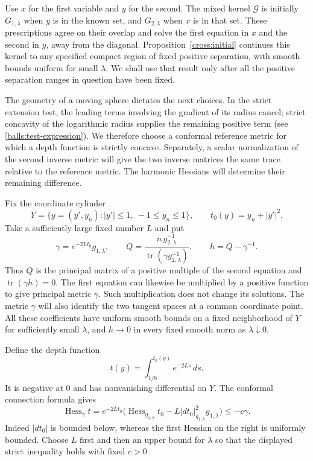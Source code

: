 Use $x$ for the first variable and $y$ for the second.  The mixed kernel
$\mathcal G$ is initially $G_{1,\lambda}$ when $y$ is in the known set,
and $G_{2,\lambda}$ when $x$ is in that set.  These prescriptions agree on
their overlap and solve the first equation in $x$ and the second in $y$,
away from the diagonal.  Proposition~\ref{cross:initial} continues this
kernel to any specified compact region of fixed positive separation,
with smooth bounds uniform for small $\lambda$.  We shall use that result
only after all the positive separation ranges in question have been fixed.

The geometry of a moving sphere dictates the next choices. In the
strict extension test, the leading terms involving the gradient of its
radius cancel; strict concavity of the logarithmic radius supplies the
remaining positive term (see \eqref{balls:test-expression}). We therefore
choose a conformal reference metric for which a depth function is
strictly concave. Separately, a scalar normalization of the second
inverse metric will give the two inverse matrices the same trace
relative to the reference metric. The harmonic Hessians will determine
their remaining difference.

Fix the coordinate cylinder
\[
 Y=\{y=(y',y_n): |y'|\leq1,\ -1\leq y_n\leq1\},
 \qquad t_0(y)=y_n+|y'|^2.
\]
Take a sufficiently large fixed number $L$ and put
\begin{equation}\label{balls:normalization}
 \gamma=e^{-2Lt_0}g_{1,\lambda},\qquad
 Q=\frac{n\,g_{2,\lambda}^{-1}}
          {\operatorname{tr}(\gamma g_{2,\lambda}^{-1})},\qquad
 h=Q-\gamma^{-1}.
\end{equation}
Thus $Q$ is the principal matrix of a positive multiple of the second
equation and $\operatorname{tr}(\gamma h)=0$.  The first equation can
likewise be multiplied by a positive function to give principal metric
$\gamma$.  Such multiplication does not change its solutions.  The
metric $\gamma$ will also identify the two tangent spaces at a common
coordinate point.  All these coefficients have uniform smooth bounds
on a fixed neighborhood of $Y$ for sufficiently small $\lambda$, and
$h\to0$ in every fixed smooth norm as $\lambda\downarrow0$.

Define the depth function
\begin{equation}\label{balls:depth}
 t(y)=\int_{1/8}^{t_0(y)}e^{-2Ls}\,ds.
\end{equation}
It is negative at $0$ and has nonvanishing differential on $Y$.  The
conformal connection formula gives
\begin{equation}\label{balls:depth-hessian}
 \operatorname{Hess}_{\gamma}t
 =e^{-2Lt_0}\bigl(
    \operatorname{Hess}_{g_{1,\lambda}}t_0
       -L|dt_0|_{g_{1,\lambda}}^2g_{1,\lambda}\bigr)
 \leq-c\gamma.
\end{equation}
Indeed $|dt_0|$ is bounded below, whereas the first Hessian on the right is
uniformly bounded.  Choose $L$ first and then an upper bound for
$\lambda$ so that the displayed strict inequality holds with fixed $c>0$.

